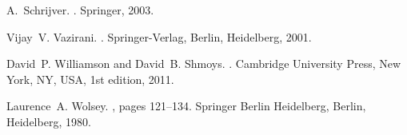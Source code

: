 \documentclass[runningheads]{llncs}
\begin{document}
\begin{thebibliography}{10}
		A.~Schrijver.
		.
		\newblock Springer, 2003.
		
		Vijay~V. Vazirani.
		.
		\newblock Springer-Verlag, Berlin, Heidelberg, 2001.
		
		David~P. Williamson and David~B. Shmoys.
		.
		\newblock Cambridge University Press, New York, NY, USA, 1st edition, 2011.
		
		Laurence~A. Wolsey.
		,
		pages 121--134.
		\newblock Springer Berlin Heidelberg, Berlin, Heidelberg, 1980.
	
\end{thebibliography}
\end{document}
